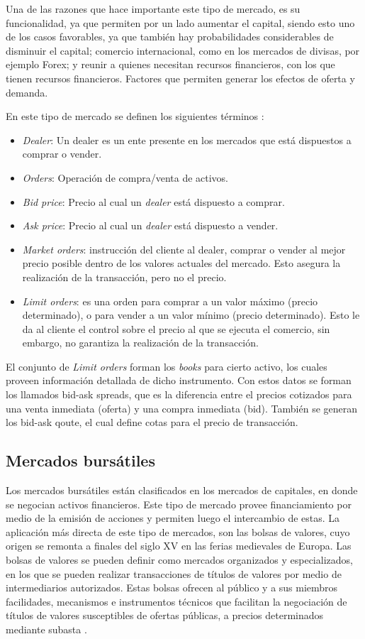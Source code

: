 Una de las razones que hace importante este tipo de mercado, es su funcionalidad, ya que permiten por un lado aumentar el capital, siendo esto uno 
de los casos favorables, ya que también hay probabilidades considerables de disminuir el capital; comercio internacional, como en los mercados de 
divisas, por ejemplo Forex; y reunir a quienes necesitan recursos financieros, con los que tienen recursos financieros. Factores que permiten generar los 
efectos de oferta y demanda.

En este tipo de mercado se definen los siguientes términos \cite{nevmyvaka2003electronic}:
\begin{itemize}
	\item \emph{Dealer}: Un dealer es un ente presente en los mercados que está dispuestos a comprar o vender.
	\item \emph{Orders}: Operación de compra/venta de activos.
	\item \emph{Bid price}: Precio al cual un \emph{dealer} está dispuesto a comprar.
	\item \emph{Ask price}: Precio al cual un \emph{dealer} está dispuesto a vender.
	\item \emph{Market orders}: instrucción del cliente al dealer, comprar o vender al mejor precio posible dentro de los valores actuales del mercado.
		Esto asegura la realización de la transacción, pero no el precio.
	\item \emph{Limit orders}: es una orden para comprar a un valor máximo (precio determinado), o para vender a un valor mínimo (precio determinado).
		Esto le da al cliente el control sobre el precio al que se ejecuta el comercio, sin embargo, no garantiza la realización de la transacción.
\end{itemize}

El conjunto de \emph{Limit orders} forman los \emph{books} para cierto activo, los cuales proveen información detallada de dicho instrumento. Con estos datos
se forman los llamados bid-ask spreads, que es la diferencia entre el precios cotizados para una venta inmediata (oferta) y una compra inmediata (bid). 
También se generan los bid-ask qoute, el cual define cotas para el precio de transacción.

\subsection{Mercados bursátiles}
Los mercados bursátiles están clasificados en los mercados de capitales, en donde se negocian activos financieros. Este tipo de mercado provee financiamiento
por medio de la emisión de acciones y permiten luego el intercambio de estas. La aplicación más directa de este tipo de mercados, son las bolsas de valores, cuyo
origen se remonta a finales del siglo XV en las ferias medievales de Europa. Las bolsas de valores se pueden definir como mercados organizados y especializados, en 
los que se pueden realizar transacciones de títulos de valores por medio de intermediarios autorizados. Estas bolsas ofrecen al público y a sus miembros facilidades, 
mecanismos e instrumentos técnicos que facilitan la negociación de títulos de valores susceptibles de ofertas públicas, a precios determinados mediante subasta \cite{levine1998stock}.

